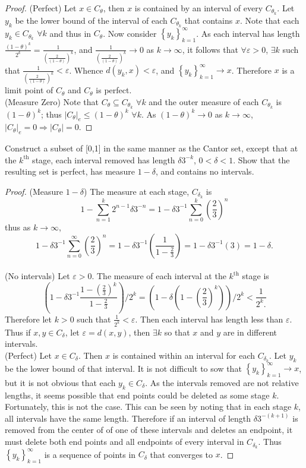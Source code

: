 \documentclass[12pt]{book}
\newcommand{\set}[1]{\left\{ #1 \right\}}
\renewcommand{\ss}{\subseteq}
\newcommand{\inv}{^{-1}}
\renewcommand{\implies}{\Rightarrow}
\renewcommand{\.}{\mkern1mu}
\newcounter{case}
\newcommand{\e}{\varepsilon}
\newcommand{\abs}[1]{\left| #1 \right|}
\newcommand{\seq}[2]{\set{#1_{#2}}_{#2=1}^{\infty}}
\newcommand{\lr}[1]{\left(#1\right)}
\theoremstyle{theorem}
\begin{document}
	\begin{proof}
	(Perfect) Let $x\in C_\theta$, then $x$ is contained by an interval of every $C_{\theta_k}$. Let $y_k$ be the lower bound of the interval of each $C_{\theta_k}$ that contains $x$. Note that each $y_k \in C_{\theta_k}$ $\forall k$ and thus in $C_\theta$. Now consider $\seq{y}{k}$. As each interval has length $\frac{(1-\theta)^k}{2^k} = \frac{1}{\lr{\frac{2}{(1-\theta)}}^k}$, and  $\frac{1}{\lr{\frac{2}{(1-\theta)}}^k} \to 0$ as $k\to \infty$, it follows that $\forall \e >0$, $\exists k$ such that $\frac{1}{\lr{\frac{2}{(1-\theta)}}^k} < \e$. Whence $d(y_k,x) <\e$, and $\seq{y}{k} \to x$. Therefore $x$ is a limit point of $C_\theta$ and $C_\theta$ is perfect.\\
	
	(Measure Zero) Note that $C_\theta \ss C_{\theta_k}$ $\forall k$ and the outer measure of each $C_{\theta_k}$ is $(1-\theta)^k$; thus $\abs{C_\theta}_e \leq (1-\theta)^k$ $\forall k$. As $(1-\theta)^k \to 0$ as $k\to\infty$, $\abs{C_\theta}_e = 0 \implies \abs{C_\theta} = 0$.
	\end{proof}
\item Construct a subset of [0,1] in the same manner as the Cantor set, except that at the $k^\text{th}$ stage, each interval removed has length $\delta3^{-k}$, $0<\delta<1$. Show that the resulting set is perfect, has measure $1-\delta$, and contains no intervals.
	\begin{proof}
	(Measure $1-\delta$) The measure at each stage, $C_{\delta_k}$ is 
		\[ 1 - \sum_{n=1}^k 2^{n-1}\delta3^{-n} = 1 - \delta3^{-1}\sum_{n=0}^k\lr{\frac{2}{3}}^n \]
	thus as $k\to\infty$, 
		\[1 - \delta3^{-1}\sum_{n=0}^\infty\lr{\frac{2}{3}}^n = 1 - \delta3^{-1}\lr{\frac{1}{1-\frac{2}{3}}} = 1 - \delta3\inv(3) = 1-\delta.\]\\
		
	(No intervals) Let $\e > 0$. The measure of each interval at the $k^\text{th}$ stage is
		\[\lr{1 - \delta3\inv\frac{1 - \lr{\frac{2}{3}}^k}{1 - \frac{2}{3}}}/2^k = \lr{1 - \delta\lr{1 - \lr{\frac{2}{3}}^k}}/2^k < \frac{1}{2^k.}\]		
	Therefore let $k > 0$ such that $\frac{1}{2^k} < \e$. Then each interval has length less than $\e$. Thus if $x, y \in C_\delta$, let $\e = d(x,y)$, then $\exists k$ so that $x$ and $y$ are in different intervals.\\
	
	(Perfect) Let $x\in C_\delta$. Then $x$ is contained within an interval for each $C_{\delta_k}$. Let $y_k$ be the lower bound of that interval. It is not difficult to sow that $\seq{y}{k} \to x$, but it is not obvious that  each $y_k \in C_\delta$. As the intervals removed are not relative lengths, it seems possible that end points could be deleted as some stage $k$. Fortunately, this is not the case. This can be seen by noting that in each stage $k$, all intervals have the same length. Therefore if an interval of length $\delta3^{-(k+1)}$ is removed from the center of of one of these intervals and deletes an endpoint, it must delete both end points and all endpoints of every interval in $C_{\delta_k}$. Thus $\seq{y}{k}$ is a sequence of points in $C_\delta$ that converges to $x$.
	\end{proof}
\end{document}
